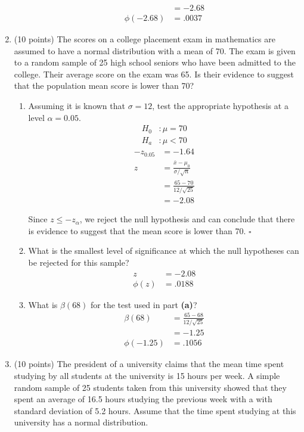 \documentclass[12pt, letter]{article}
\newenvironment{nscenter}
	{\parskip=0pt\par\nopagebreak\centering}
	{\par\noindent\ignorespacesafterend}
\begin{document}
\begin{enumerate}
\begin{enumerate}
\begin{align*}
			&= -2.68 \\
			\phi(-2.68) &= \boxed{.0037}
		\end{align*}
	\end{enumerate}
	\setcounter{enumi}{5}
	\item (10 points) The scores on a college placement exam in mathematics are assumed to have a normal distribution with a mean of 70. The exam is given to a random sample of 25 high school seniors who have been admitted to the college. Their average score on the exam was 65. Is their evidence to suggest that the population mean score is lower than 70?
	\begin{enumerate}
		\item Assuming it is known that $\sigma = 12$, test the appropriate hypothesis at a level $\alpha = 0.05$.
		\begin{align*}
			H_{0}&: \mu = 70 \\
			H_{a}&: \mu < 70
		\end{align*}
		\begin{align*}
			-z_{0.05} &= -1.64 \\
			z &= \frac{\bar{x} - \mu_{0}}{\sigma / \sqrt{n}} \\
			&= \frac{65 - 70}{12 / \sqrt{25}} \\
			&= -2.08
		\end{align*}
		\begin{nscenter}
			Since $z \leq -z_{\alpha}$, we reject the null hypothesis and can conclude that there is evidence to suggest that the mean score is lower than 70. $\square$
		\end{nscenter}
		\item What is the smallest level of significance at which the null hypotheses can be rejected for this sample?
		\begin{align*}
			z &= -2.08 \\
			\phi(z) &= \boxed{.0188}
		\end{align*}
		\item What is $\beta(68)$ for the test used in part \textbf{(a)}?
		\begin{align*}
			\beta(68) &= \frac{65 - 68}{12 / \sqrt{25}} \\
			&= -1.25 \\
			\phi(-1.25) &= \boxed{.1056}
		\end{align*}
	\end{enumerate}
	\setcounter{enumi}{10}
	\item (10 points) The president of a university claims that the mean time spent studying by all students at the university is 15 hours per week. A simple random sample of 25 students taken from this university showed that they spent an average of 16.5 hours studying the previous week with a with standard deviation of 5.2 hours. Assume that the time spent studying at this university has a normal distribution.

\end{enumerate}
\end{document}
